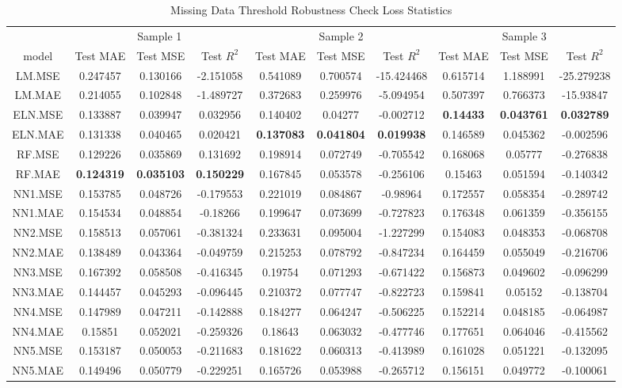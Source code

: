\begin{table}

\caption{\label{tab:}Missing Data Threshold Robustness Check Loss Statistics}
\centering
\fontsize{6}{8}\selectfont
\begin{tabular}[t]{cccccccccc}
\toprule
\multicolumn{1}{c}{ } & \multicolumn{3}{c}{Sample 1} & \multicolumn{3}{c}{Sample 2} & \multicolumn{3}{c}{Sample 3} \\
\cmidrule(l{3pt}r{3pt}){2-4} \cmidrule(l{3pt}r{3pt}){5-7} \cmidrule(l{3pt}r{3pt}){8-10}
model & Test MAE & Test MSE & Test $R^2$ & Test MAE & Test MSE & Test $R^2$ & Test MAE & Test MSE & Test $R^2$\\
\midrule
LM.MSE & 0.247457 & 0.130166 & -2.151058 & 0.541089 & 0.700574 & -15.424468 & 0.615714 & 1.188991 & -25.279238\\
LM.MAE & 0.214055 & 0.102848 & -1.489727 & 0.372683 & 0.259976 & -5.094954 & 0.507397 & 0.766373 & -15.93847\\
ELN.MSE & 0.133887 & 0.039947 & 0.032956 & 0.140402 & 0.04277 & -0.002712 & \textbf{0.14433} & \textbf{0.043761} & \textbf{0.032789}\\
ELN.MAE & 0.131338 & 0.040465 & 0.020421 & \textbf{0.137083} & \textbf{0.041804} & \textbf{0.019938} & 0.146589 & 0.045362 & -0.002596\\
RF.MSE & 0.129226 & 0.035869 & 0.131692 & 0.198914 & 0.072749 & -0.705542 & 0.168068 & 0.05777 & -0.276838\\
\addlinespace
RF.MAE & \textbf{0.124319} & \textbf{0.035103} & \textbf{0.150229} & 0.167845 & 0.053578 & -0.256106 & 0.15463 & 0.051594 & -0.140342\\
NN1.MSE & 0.153785 & 0.048726 & -0.179553 & 0.221019 & 0.084867 & -0.98964 & 0.172557 & 0.058354 & -0.289742\\
NN1.MAE & 0.154534 & 0.048854 & -0.18266 & 0.199647 & 0.073699 & -0.727823 & 0.176348 & 0.061359 & -0.356155\\
NN2.MSE & 0.158513 & 0.057061 & -0.381324 & 0.233631 & 0.095004 & -1.227299 & 0.154083 & 0.048353 & -0.068708\\
NN2.MAE & 0.138489 & 0.043364 & -0.049759 & 0.215253 & 0.078792 & -0.847234 & 0.164459 & 0.055049 & -0.216706\\
\addlinespace
NN3.MSE & 0.167392 & 0.058508 & -0.416345 & 0.19754 & 0.071293 & -0.671422 & 0.156873 & 0.049602 & -0.096299\\
NN3.MAE & 0.144457 & 0.045293 & -0.096445 & 0.210372 & 0.077747 & -0.822723 & 0.159841 & 0.05152 & -0.138704\\
NN4.MSE & 0.147989 & 0.047211 & -0.142888 & 0.184277 & 0.064247 & -0.506225 & 0.152214 & 0.048185 & -0.064987\\
NN4.MAE & 0.15851 & 0.052021 & -0.259326 & 0.18643 & 0.063032 & -0.477746 & 0.177651 & 0.064046 & -0.415562\\
NN5.MSE & 0.153187 & 0.050053 & -0.211683 & 0.181622 & 0.060313 & -0.413989 & 0.161028 & 0.051221 & -0.132095\\
\addlinespace
NN5.MAE & 0.149496 & 0.050779 & -0.229251 & 0.165726 & 0.053988 & -0.265712 & 0.156151 & 0.049772 & -0.100061\\
\bottomrule
\end{tabular}
\end{table}